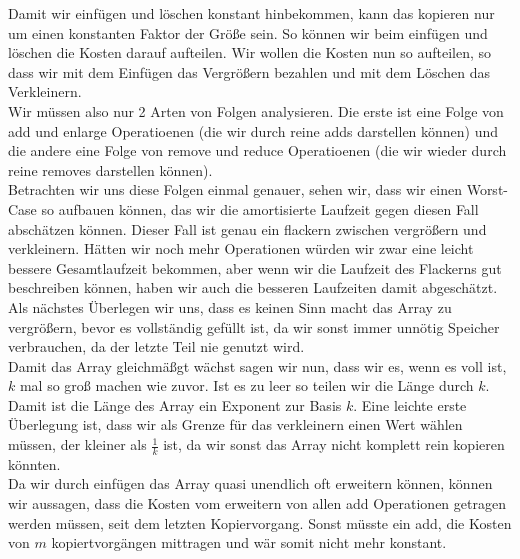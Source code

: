 \documentclass[11pt,a4paper,ngerman]{article}
\begin{document}
\begin{enumerate}[\bfseries a)]
Damit wir einfügen und löschen konstant hinbekommen, kann das kopieren nur um einen konstanten Faktor der Größe sein. So können wir beim einfügen und löschen die Kosten darauf aufteilen. Wir wollen die Kosten nun so aufteilen, so dass wir mit dem Einfügen das Vergrößern bezahlen und mit dem Löschen das Verkleinern.\\

Wir müssen also nur 2 Arten von Folgen analysieren. Die erste ist eine Folge von add und enlarge Operatioenen (die wir durch reine adds darstellen können) und die andere eine Folge von remove und reduce Operatioenen  (die wir wieder durch reine removes darstellen können).\\

Betrachten wir uns diese Folgen einmal genauer, sehen wir, dass wir einen Worst-Case so aufbauen können, das wir die amortisierte Laufzeit gegen diesen Fall abschätzen können. Dieser Fall ist genau ein flackern zwischen vergrößern und verkleinern. Hätten wir noch mehr Operationen würden wir zwar eine leicht bessere Gesamtlaufzeit bekommen, aber wenn wir die Laufzeit des Flackerns gut beschreiben können, haben wir auch die besseren Laufzeiten damit abgeschätzt.\\

Als nächstes Überlegen wir uns, dass es keinen Sinn macht das Array zu vergrößern, bevor es vollständig gefüllt ist, da wir sonst immer unnötig Speicher verbrauchen, da der letzte Teil nie genutzt wird.\\

Damit das Array gleichmäßgt wächst sagen wir nun, dass wir es, wenn es voll ist, $k$ mal so groß machen wie zuvor. Ist es zu leer so teilen wir die Länge durch $k$. Damit ist die Länge des Array ein Exponent zur Basis $k$. Eine leichte erste Überlegung ist, dass wir als Grenze für das verkleinern einen Wert wählen müssen, der kleiner als $\frac{1}{k}$ ist, da wir sonst das Array nicht komplett rein kopieren könnten.\\

Da wir durch einfügen das Array quasi unendlich oft erweitern können, können wir aussagen, dass die Kosten vom erweitern von allen add Operationen getragen werden müssen, seit dem letzten Kopiervorgang. Sonst müsste ein add, die Kosten von $m$ kopiertvorgängen mittragen und wär somit nicht mehr konstant.\\


\end{enumerate}
\end{document}
